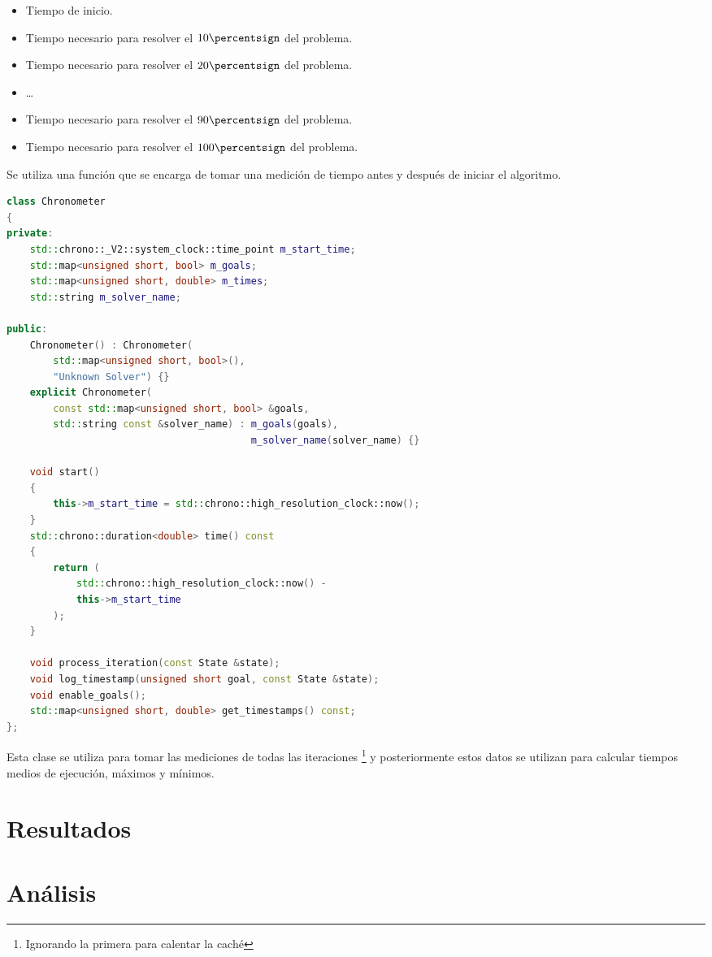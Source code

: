 \begin{itemize}[itemsep=0.25px]
    \item Tiempo de inicio.
    \item Tiempo necesario para resolver el $10\percentsign$ del problema.
    \item Tiempo necesario para resolver el $20\percentsign$ del problema.
    \item \dots
    \item Tiempo necesario para resolver el $90\percentsign$ del problema.
    \item Tiempo necesario para resolver el $100\percentsign$ del problema.
\end{itemize}
Se utiliza una función que se encarga de tomar una medición de tiempo
antes y después de iniciar el algoritmo.

\begin{lstlisting}[language=C++]
class Chronometer
{
private:
    std::chrono::_V2::system_clock::time_point m_start_time;
    std::map<unsigned short, bool> m_goals;
    std::map<unsigned short, double> m_times;
    std::string m_solver_name;

public:
    Chronometer() : Chronometer(
        std::map<unsigned short, bool>(),
        "Unknown Solver") {}
    explicit Chronometer(
        const std::map<unsigned short, bool> &goals,
        std::string const &solver_name) : m_goals(goals),
                                          m_solver_name(solver_name) {}

    void start()
    {
        this->m_start_time = std::chrono::high_resolution_clock::now();
    }
    std::chrono::duration<double> time() const
    {
        return (
            std::chrono::high_resolution_clock::now() -
            this->m_start_time
        );
    }

    void process_iteration(const State &state);
    void log_timestamp(unsigned short goal, const State &state);
    void enable_goals();
    std::map<unsigned short, double> get_timestamps() const;
};
\end{lstlisting}

Esta clase se utiliza para tomar las mediciones de todas las iteraciones
\footnote{Ignorando la primera para calentar la caché}
y posteriormente estos datos se utilizan para calcular tiempos medios de ejecución,
máximos y mínimos.

\section{Resultados}

\section{Análisis}
